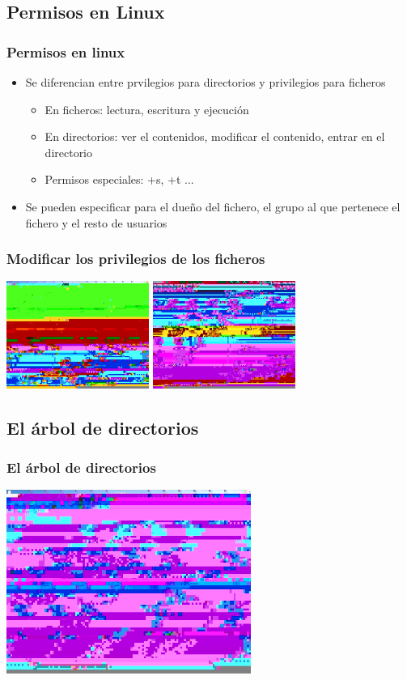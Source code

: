 \subsection{Permisos en Linux}
\frame
{
	\frametitle{Permisos en linux}
	\begin{center}
		\begin{itemize}
			\item<1->{Se diferencian entre prvilegios para directorios y privilegios para ficheros}
				\begin{itemize}
					\item<2->{En ficheros: lectura, escritura y ejecución}
					\item<3->{En directorios: ver el contenidos, modificar el contenido, entrar en el directorio}
					\item<4->{Permisos especiales: +s, +t ...}
				\end{itemize}
			\item<5->{Se pueden especificar para el dueño del fichero, el grupo al que pertenece el fichero y el resto de usuarios}
		\end{itemize}
	\end{center}
}
\frame
{
	\frametitle{Modificar los privilegios de los ficheros}
	\begin{center}
		\includegraphics[height=3.5cm]{./imgs/konqueror-preferencias}
		\includegraphics[height=3.5cm]{./imgs/konqueror-privilegios}
	\end{center}
}

\subsection{El árbol de directorios}
\frame
{
	\frametitle{El árbol de directorios}
	\begin{center}
		\includegraphics[height=6cm]{./imgs/konqueror-arbol}
	\end{center}
}
